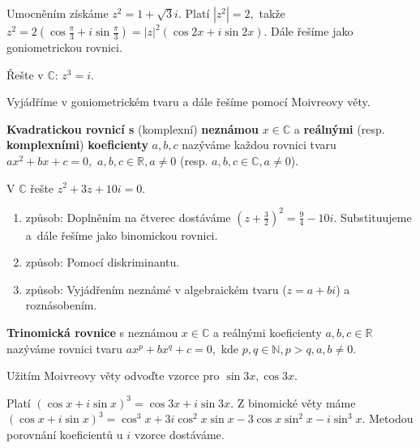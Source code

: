 \begin{reseni}
Umocněním získáme $z^2=1+\sqrt{3}i. $ Platí $|z^2|=2,$ takže $z^2=2(\cos \frac{\pi}{3}+i\sin \frac{\pi}{3})=|z|^2(\cos 2x+i\sin 2x)$.
Dále řešíme jako goniometrickou rovnici.
\end{reseni}

\begin{priklad}
Řešte v $\mathbb C$: $z^3=i.$
\end{priklad}

\begin{reseni}
Vyjádříme v goniometrickém tvaru a dále řešíme pomocí Moivreovy věty.
\end{reseni}

\begin{definition}
\textbf{Kvadratickou rovnicí s} (komplexní) \textbf{neznámou} $x\in \mathbb C$ a
\textbf{reálnými} (resp. \textbf{komplexními}) \textbf{koeficienty} $a,b,c$
nazýváme každou rovnici tvaru
$ax^2+bx+c=0,$ $a,b,c\in \mathbb R,a\ne0$ (resp. $a,b,c \in \mathbb C,a\ne 0$).
\end{definition}

\begin{priklad}
V $\mathbb C$ řešte $z^2+3z+10i=0.$
\end{priklad}

\begin{reseni}
\begin{enumerate}[1.]
\item způsob: Doplněním na čtverec dostáváme $\left ( z+\frac{3}{2} \right )^2=\frac{9}{4}-10i. $
Substituujeme a~dále řešíme jako binomickou rovnici.
\item způsob: Pomocí diskriminantu.
\item způsob: Vyjádřením neznámé v algebraickém tvaru ($z=a+bi$) a roznásobením.
\end{enumerate}
\end{reseni}

\begin{definition}
\textbf{Trinomická rovnice} s neznámou $x\in \mathbb C$ a reálnými koeficienty $a,b,c \in \mathbb R$
nazýváme rovnici tvaru $ax^p + bx^q + c = 0,$ kde $p,q\in \mathbb N, p>q, a,b\ne 0.$
\end{definition}

\begin{priklad}
Užitím Moivreovy věty odvoďte vzorce pro $\sin 3x, \cos 3x.$
\end{priklad}

\begin{reseni}
Platí $(\cos x + i\sin x)^3=\cos 3x+i\sin 3x.$ Z binomické věty máme
$(\cos x+i\sin x)^3=\cos^3 x + 3i\cos^2 x\sin x - 3\cos x\sin^2 x-i\sin^3 x.$
Metodou porovnání koeficientů u $i$ vzorce dostáváme.
\end{reseni}
